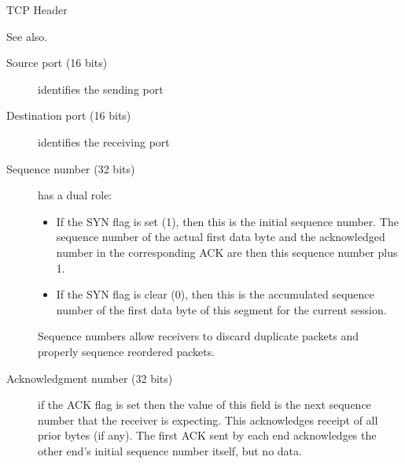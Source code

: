 \begin{frame}{TCP Header}
  \begin{center}
     \label{fig:tcp-segment-format}
  \end{center}  
\end{frame}

See also.
\begin{description}
\item[Source port (16 bits)] identifies the sending port
\item[Destination port (16 bits)] identifies the receiving port
\item[Sequence number (32 bits)] has a dual role:
  \begin{itemize}
  \item If the SYN flag is set (1), then this is the initial sequence number. The sequence
    number of the actual first data byte and the acknowledged number in the corresponding
    ACK are then this sequence number plus 1.
  \item If the SYN flag is clear (0), then this is the accumulated sequence number of the
    first data byte of this segment for the current session.
  \end{itemize}
  Sequence numbers allow receivers to discard duplicate packets and properly sequence
  reordered packets.
\item[Acknowledgment number (32 bits)] if the ACK flag is set then the value of this field
  is the next sequence number that the receiver is expecting. This acknowledges receipt of
  all prior bytes (if any). The first ACK sent by each end acknowledges the other end's
  initial sequence number itself, but no data.


\end{description}
